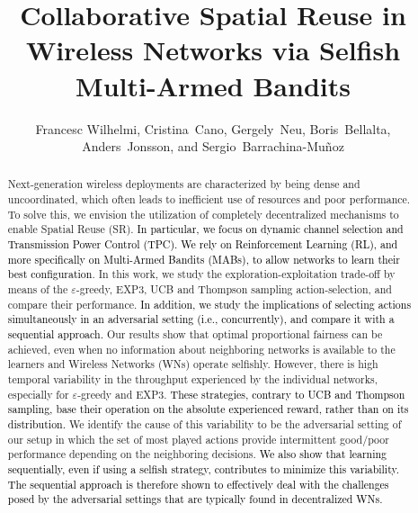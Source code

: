 \documentclass{article}
\begin{document}
		\setcounter{page}{63}
	
		\title{Collaborative Spatial Reuse in Wireless Networks via Selfish Multi-Armed Bandits}
		\author{Francesc Wilhelmi, Cristina~Cano, Gergely~Neu, Boris~Bellalta,\\ Anders~Jonsson, and Sergio~Barrachina-Mu\~noz}
		\date{ }
		\maketitle
		\begin{abstract}
			Next-generation wireless deployments are characterized by being dense and uncoordinated, which often leads to inefficient use of resources and poor performance. To solve this, we envision the utilization of completely decentralized mechanisms to enable Spatial Reuse (SR). \textcolor{black}{In particular, we focus on dynamic channel selection and Transmission Power Control (TPC). We rely on Reinforcement Learning (RL), and more specifically on Multi-Armed Bandits (MABs), to allow networks to learn their best configuration}. In this work, we study the exploration-exploitation trade-off by means of the $\varepsilon$-greedy, EXP3, UCB and Thompson sampling action-selection, and compare their performance. \textcolor{black}{In addition, we study the implications of selecting actions simultaneously in an adversarial setting \textcolor{black}{(i.e., concurrently)}, \textcolor{black}{and compare it with a sequential approach}.} Our results show that optimal proportional fairness can be achieved, even when no information about neighboring networks is available to the learners and Wireless Networks (WNs) operate selfishly. However, there is high temporal variability in the throughput experienced by the individual networks, especially for $\varepsilon$-greedy and EXP3. \textcolor{black}{These strategies, contrary to UCB and Thompson sampling, base their operation on the absolute experienced reward, rather than on its distribution.} We identify the cause of this variability to be the adversarial setting of our setup in which the set of most played actions provide intermittent good/poor performance depending on the neighboring decisions. \textcolor{black}{We also show that \textcolor{black}{learning sequentially, even if using a selfish strategy,} contributes to minimize this variability. \textcolor{black}{The sequential approach is therefore shown to effectively deal with the challenges posed by the adversarial settings that are typically found in decentralized WNs.}}%
		\end{abstract}
	
\end{document}
